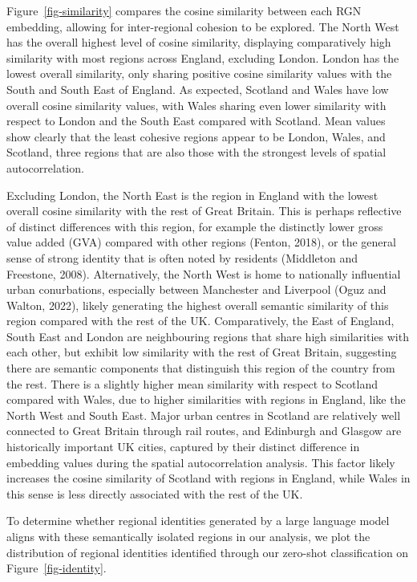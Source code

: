 \documentclass[
]{article}
\begin{document}
Figure~\ref{fig-similarity} compares the cosine similarity between each
RGN embedding, allowing for inter-regional cohesion to be explored. The
North West has the overall highest level of cosine similarity,
displaying comparatively high similarity with most regions across
England, excluding London. London has the lowest overall similarity,
only sharing positive cosine similarity values with the South and South
East of England. As expected, Scotland and Wales have low overall cosine
similarity values, with Wales sharing even lower similarity with respect
to London and the South East compared with Scotland. Mean values show
clearly that the least cohesive regions appear to be London, Wales, and
Scotland, three regions that are also those with the strongest levels of
spatial autocorrelation.

Excluding London, the North East is the region in England with the
lowest overall cosine similarity with the rest of Great Britain. This is
perhaps reflective of distinct differences with this region, for example
the distinctly lower gross value added (GVA) compared with other regions
(Fenton, 2018), or the general sense of strong identity that is often
noted by residents (Middleton and Freestone, 2008). Alternatively, the
North West is home to nationally influential urban conurbations,
especially between Manchester and Liverpool (Oguz and Walton, 2022),
likely generating the highest overall semantic similarity of this region
compared with the rest of the UK. Comparatively, the East of England,
South East and London are neighbouring regions that share high
similarities with each other, but exhibit low similarity with the rest
of Great Britain, suggesting there are semantic components that
distinguish this region of the country from the rest. There is a
slightly higher mean similarity with respect to Scotland compared with
Wales, due to higher similarities with regions in England, like the
North West and South East. Major urban centres in Scotland are
relatively well connected to Great Britain through rail routes, and
Edinburgh and Glasgow are historically important UK cities, captured by
their distinct difference in embedding values during the spatial
autocorrelation analysis. This factor likely increases the cosine
similarity of Scotland with regions in England, while Wales in this
sense is less directly associated with the rest of the UK.

To determine whether regional identities generated by a large language
model aligns with these semantically isolated regions in our analysis,
we plot the distribution of regional identities identified through our
zero-shot classification on Figure~\ref{fig-identity}.
\end{document}
